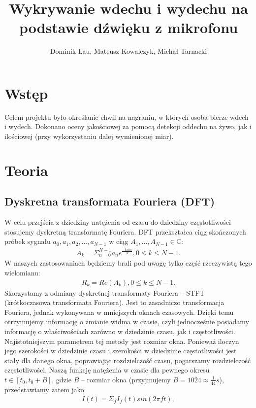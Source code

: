 \documentclass[polish]{article}
\title{Wykrywanie wdechu i wydechu na podstawie dźwięku z mikrofonu}
\author{Dominik Lau, Mateusz Kowalczyk, Michał Tarnacki}
\begin{document}
\maketitle
\tableofcontents

\section{Wstęp}
Celem projektu było określanie chwil na nagraniu, w których osoba bierze wdech i wydech. 
Dokonano oceny jakościowej za pomocą detekcji oddechu na żywo, jak i ilościowej (przy wykorzystaniu dalej wymienionej miar).

\section{Teoria}
\subsection{Dyskretna transformata Fouriera (DFT)}
W celu przejścia z dziedziny natężenia od czasu do dziedziny częstotliwości stosujemy dyskretną transformatę Fouriera.  DFT przekształca ciąg skończonych próbek sygnału $a_0, a_1, a_2, ..., a_{N-1}$ w ciąg 
$A_1, ..., A_{N-1} \in \mathbb{C}$:
\begin{gather*}
	A_k = \Sigma_{n=0}^{N-1} a_ne^{\frac{-kni\pi}{N}}, 0 \le k \le N-1.
\end{gather*}
W naszych zastosowaniach będziemy brali pod uwagę tylko część rzeczywistą tego wielomianu:
\begin{gather*}
	R_k = Re(A_k), 0 \le k \le N-1.
\end{gather*}
Skorzystamy z odmiany dyskretnej transformaty Fouriera -- STFT (krótkoczasowa transformata Fouriera). 
Jest to zasadniczo transformacja Fouriera, jednak wykonywana w mniejszych oknach czasowych. Dzięki temu otrzymujemy informację o zmianie widma w czasie, czyli jednocześnie posiadamy informację o właściwościach zarówno w dziedzinie czasu, jak i częstotliwości. Najistotniejszym parametrem tej metody jest rozmiar okna. Ponieważ iloczyn jego szerokości w dziedzinie czasu i szerokości w dziedzinie częstotliwości jest stały dla danego okna, poprawiając rozdzielczość czasu, pogarszamy rozdzielczość częstotliwości.
Naszą funkcję natężenia w czasie dla pewnego okresu $t \in [t_0, t_0 + B]$, gdzie $B$ -- rozmiar okna (przyjmujemy $B=1024\approx \frac{1}{44} s$), przedstawiamy zatem jako 
\begin{gather*}
	I(t) = \Sigma_{f} I_{f}(t)sin(2 \pi f t),
\end{gather*}
\end{document}
